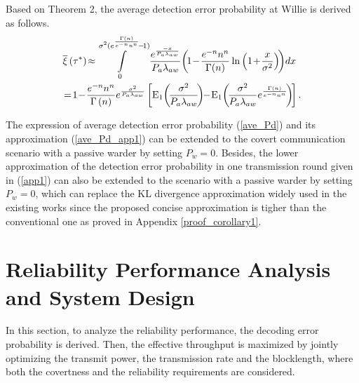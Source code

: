 \documentclass[conference]{IEEEtran}
\begin{document}
Based on Theorem 2, the average detection error probability at Willie is derived as follows.
\begin{equation}\label{ave_Pd_app1}
	\begin{aligned}
		&\overline \xi  \left( {{\tau ^*}} \right)    \!\approx\! \int\limits_0^{{\sigma ^2}({e^{\frac{{\Gamma (n)}}{{{e^{ - n}}{n^n}}}}} \!-\! 1)} {\frac{{{e^{ \frac{-x}{{{P_a}{\lambda _{aw}}}}}}}}{{{P_a}{\lambda _{aw}}}}\!\left(\! {1 \!-\! \frac{{{e^{ - n}}{n^n}}}{{\Gamma (n)}}\ln \left( {1 \!+\! \frac{x}{{{\sigma ^2}}}} \right)} \!\right)\!dx}  \\
		& \!=\! 1 \!-\! \frac{{{e^{ - n}}{n^n}}}{{\Gamma \left( n \right)}}{e^{\frac{{{\sigma ^2}}}{{{P_a}{\lambda _{aw}}}}}}\left[ {{{\rm{E}}_{\rm{1}}}\!\left(\! {\frac{{{\sigma ^2}}}{{{P_a}{\lambda _{aw}}}}} \!\right)\! \!-\! {{\rm{E}}_{\rm{1}}}\!\left(\! {\frac{{{\sigma ^2}}}{{{P_a}{\lambda _{aw}}}}{e^{\frac{{\Gamma \left( n \right)}}{{{e^{ - n}}{n^n}}}}}} \!\right)\!} \right].
	\end{aligned}
\end{equation}

The expression of average detection error probability (\ref{ave_Pd}) and its approximation (\ref{ave_Pd_app1}) can be extended to the covert communication scenario with a passive warder by setting $P_w=0$. Besides, the lower approximation of the detection error probability in one transmission round given in (\ref{app1}) can also be extended to the scenario with a passive warder by setting $P_w=0$, which can replace the KL divergence approximation widely used in the existing works since the proposed concise approximation is tigher than the conventional one as proved in Appendix \ref{proof_corollary1}.

\section{Reliability Performance Analysis and System Design}
In this section, to analyze the reliability performance, the decoding error probability is derived. Then, the effective throughput is maximized by jointly optimizing the transmit power, the transmission rate and the blocklength, where both the covertness and the reliability requirements are considered.
\end{document}
